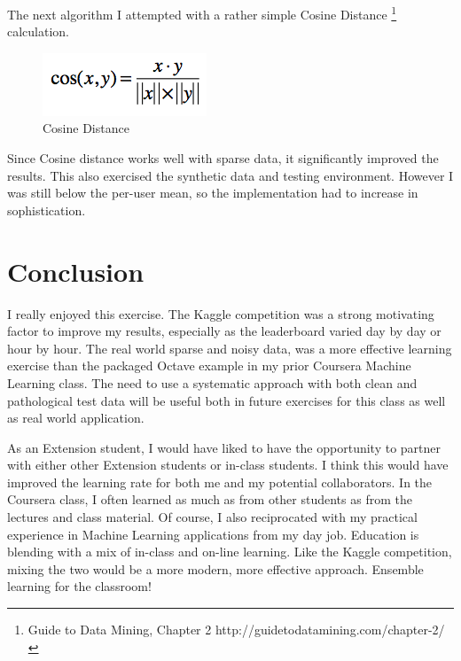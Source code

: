 \documentclass[11pt, oneside]{article}   	%
\begin{document}
The next algorithm I attempted with a rather simple Cosine Distance \footnote{Guide to Data Mining, Chapter 2 http://guidetodatamining.com/chapter-2/}
calculation.
\begin{figure}[h!]
\centering
\includegraphics[scale=0.8]{cosine}
\caption{Cosine Distance}
\end{figure}

Since Cosine distance works well with sparse data, it significantly improved the results. This also exercised the synthetic data and testing environment. However I was still below the per-user mean, so the implementation had to increase in sophistication.

\section*{Conclusion}

I really enjoyed this exercise. The Kaggle competition was a strong motivating factor to improve my results, especially as the leaderboard varied day by day or hour by hour. The real world sparse and noisy data, was a more effective learning exercise than the packaged Octave example in my prior Coursera Machine Learning class. The need to use a systematic approach with both clean and pathological test data will be useful both in future exercises for this class as well as real world application.

As an Extension student, I would have liked to have the opportunity to partner with either other Extension students or in-class students. I think this would have improved the learning rate for both me and my potential collaborators. In the Coursera class, I often learned as much as from other students as from the lectures and class material. Of course, I also reciprocated with my practical experience in Machine Learning applications from my day job. Education is blending with a mix of in-class and on-line learning. Like the Kaggle competition, mixing the two would be a more modern, more effective approach. Ensemble learning for the classroom!
\end{document}
